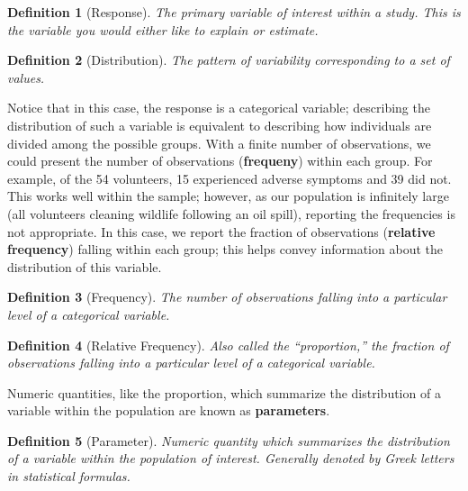 \documentclass[
]{book}
\theoremstyle{plain}
\theoremstyle{mydefn}
\newtheorem{definition}{Definition}[chapter]
\theoremstyle{myexmpl}
\theoremstyle{remark}
\begin{document}
\begin{definition}[Response]
\protect\hypertarget{def:defn-response}{}{\label{def:defn-response} {} }The primary variable of interest within a study. This is the variable you would either like to explain or estimate.
\end{definition}

\begin{definition}[Distribution]
\protect\hypertarget{def:defn-distribution}{}{\label{def:defn-distribution} {} }The pattern of variability corresponding to a set of values.
\end{definition}

Notice that in this case, the response is a categorical variable; describing the distribution of such a variable is equivalent to describing how individuals are divided among the possible groups. With a finite number of observations, we could present the number of observations (\textbf{frequeny}) within each group. For example, of the 54 volunteers, 15 experienced adverse symptoms and 39 did not. This works well within the sample; however, as our population is infinitely large (all volunteers cleaning wildlife following an oil spill), reporting the frequencies is not appropriate. In this case, we report the fraction of observations (\textbf{relative frequency}) falling within each group; this helps convey information about the distribution of this variable.

\begin{definition}[Frequency]
\protect\hypertarget{def:defn-frequency}{}{\label{def:defn-frequency} {} }The number of observations falling into a particular level of a categorical variable.
\end{definition}

\begin{definition}[Relative Frequency]
\protect\hypertarget{def:defn-relative-frequency}{}{\label{def:defn-relative-frequency} {} }Also called the ``proportion,'' the fraction of observations falling into a particular level of a categorical variable.
\end{definition}

Numeric quantities, like the proportion, which summarize the distribution of a variable within the population are known as \textbf{parameters}.

\begin{definition}[Parameter]
\protect\hypertarget{def:defn-parameter}{}{\label{def:defn-parameter} {} }Numeric quantity which summarizes the distribution of a variable within the \emph{population} of interest. Generally denoted by Greek letters in statistical formulas.
\end{definition}
\end{document}
